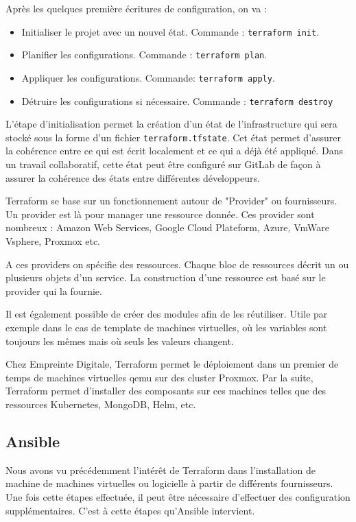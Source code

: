 \documentclass[12pt]{article}
\begin{document}
Après les quelques première écritures de configuration, on va :
\begin{itemize}
    \item Initialiser le projet avec un nouvel état. Commande : \texttt{terraform init}.
    \item Planifier les configurations. Commande : \texttt{terraform plan}.
    \item Appliquer les configurations. Commande: \texttt{terraform apply}.
    \item Détruire les configurations si nécessaire. Commande : \texttt{terraform destroy}
\end{itemize}

L'étape d'initialisation permet la création d'un état de l'infrastructure qui sera stocké sous la forme d'un fichier \texttt{terraform.tfstate}. 
Cet état permet d'assurer la cohérence entre ce qui est écrit localement et ce qui a déjà été appliqué. 
Dans un travail collaboratif, cette état peut être configuré sur GitLab de façon à assurer la cohérence des états entre différentes développeurs.

Terraform se base sur un fonctionnement autour de "Provider" ou fournisseurs. 
Un provider est là pour manager une ressource donnée. Ces provider sont nombreux : Amazon Web Services, Google Cloud Plateform, Azure, VmWare Vsphere, Proxmox etc.

A ces providers on spécifie des ressources. 
Chaque bloc de ressources décrit un ou plusieurs objets d'un service. 
La construction d'une ressource est basé sur le provider qui la fournie.

Il est également possible de créer des modules afin de les réutiliser. 
Utile par exemple dans le cas de template de machines virtuelles, où les variables sont toujours les mêmes mais où seuls les valeurs changent.

Chez Empreinte Digitale, Terraform permet le déploiement dans un premier de temps de machines virtuelles qemu sur des cluster Proxmox. 
Par la suite, Terraform permet d'installer des composants sur ces machines telles que des ressources Kubernetes, MongoDB, Helm, etc.

\newpage
\subsection{Ansible}
Nous avons vu précédemment l'intérêt de Terraform dans l'installation de machine de machines virtuelles ou logicielle à partir de différents fournisseurs. 
Une fois cette étapes effectuée, il peut être nécessaire d'effectuer des configuration supplémentaires. 
C'est à cette étapes qu'Ansible intervient.
\end{document}
